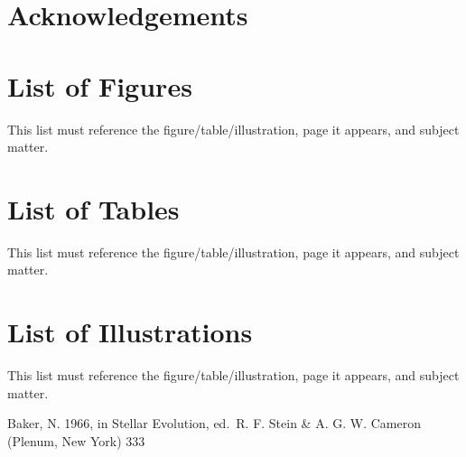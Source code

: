 \documentclass[12pt]{article}
\newcommand{\startarabic}{
  \clearpage
  \pagenumbering{arabic}
}
\begin{document}
\newpage

\section{Acknowledgements}

\newpage

\tableofcontents

\newpage

\section{List of Figures}
This list must reference the figure/table/illustration, page it appears, and subject matter.

\newpage

\section{List of Tables}
This list must reference the figure/table/illustration, page it appears, and subject matter.

\newpage

\section{List of Illustrations}
This list must reference the figure/table/illustration, page it appears, and subject matter.

\newpage



\newpage
\startarabic %






\newpage


\begin{thebibliography}{}

     Baker, N. 1966,
    in Stellar Evolution,
    ed.\ R. F. Stein \& A. G. W. Cameron
    (Plenum, New York) 333

\end{thebibliography}
\end{document}
